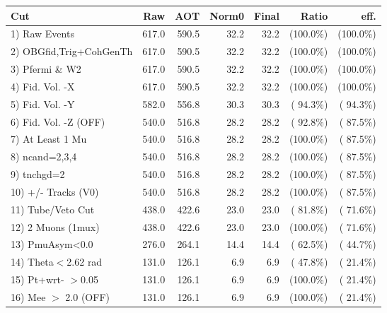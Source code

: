  \begin{table}[h!]\centering
 \begin{tabular}{||l||r|r|r|r|r|r||}
 \hline
 \hline
 Cut & Raw & AOT & Norm0 & Final & Ratio & eff.       \\
 \hline
  1) Raw Events           &        617.0 &        590.5 &         32.2 &         32.2 & (100.0\%) & (100.0\%) \\
  2) OBGfid,Trig+CohGenTh &        617.0 &        590.5 &         32.2 &         32.2 & (100.0\%) & (100.0\%) \\
  3) Pfermi \& W2         &        617.0 &        590.5 &         32.2 &         32.2 & (100.0\%) & (100.0\%) \\
  4) Fid. Vol. -X         &        617.0 &        590.5 &         32.2 &         32.2 & (100.0\%) & (100.0\%) \\
  5) Fid. Vol. -Y         &        582.0 &        556.8 &         30.3 &         30.3 & ( 94.3\%) & ( 94.3\%) \\
  6) Fid. Vol. -Z (OFF)   &        540.0 &        516.8 &         28.2 &         28.2 & ( 92.8\%) & ( 87.5\%) \\
  7) At Least 1 Mu        &        540.0 &        516.8 &         28.2 &         28.2 & (100.0\%) & ( 87.5\%) \\
  8) ncand=2,3,4          &        540.0 &        516.8 &         28.2 &         28.2 & (100.0\%) & ( 87.5\%) \\
  9) tnchgd=2             &        540.0 &        516.8 &         28.2 &         28.2 & (100.0\%) & ( 87.5\%) \\
 10) +/- Tracks (V0)      &        540.0 &        516.8 &         28.2 &         28.2 & (100.0\%) & ( 87.5\%) \\
 11) Tube/Veto Cut        &        438.0 &        422.6 &         23.0 &         23.0 & ( 81.8\%) & ( 71.6\%) \\
 12) 2 Muons (1mux)       &        438.0 &        422.6 &         23.0 &         23.0 & (100.0\%) & ( 71.6\%) \\
 13) PmuAsym<0.0          &        276.0 &        264.1 &         14.4 &         14.4 & ( 62.5\%) & ( 44.7\%) \\
 14) Theta$<$2.62 rad     &        131.0 &        126.1 &          6.9 &          6.9 & ( 47.8\%) & ( 21.4\%) \\
 15) Pt+wrt- $>$0.05      &        131.0 &        126.1 &          6.9 &          6.9 & (100.0\%) & ( 21.4\%) \\
 16) Mee $>$ 2.0  (OFF)   &        131.0 &        126.1 &          6.9 &          6.9 & (100.0\%) & ( 21.4\%) \\

\end{tabular}
\end{table}
